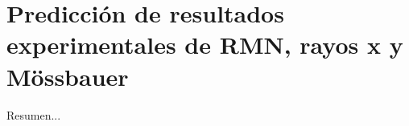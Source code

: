 \chapter{Predicción de resultados experimentales de RMN, rayos x y Mössbauer}\label{ch:prediccion}
\thispagestyle{empty}

\vspace{50pt}

\begin{adjustwidth}{50pt}{50pt}
    Resumen...
\end{adjustwidth}

\clearpage
\newpage
\thispagestyle{empty}
\mbox{}
\newpage









